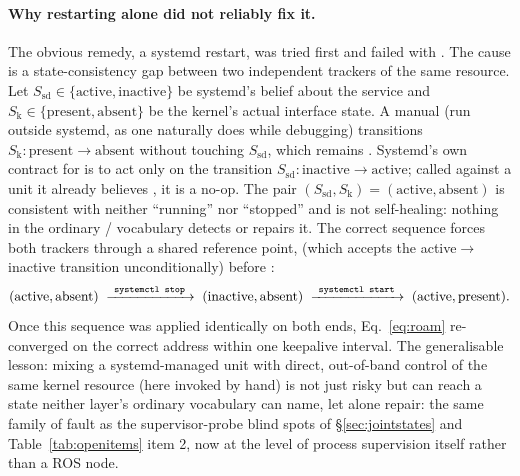 \paragraph{Why restarting alone did not reliably fix it.} The obvious remedy,
a systemd restart, was tried first and failed with
. The cause is a state-consistency gap
between two independent trackers of the same resource. Let
$S_{\mathrm{sd}}\in\{\text{active},\text{inactive}\}$ be systemd's belief
about the service and $S_{\mathrm{k}}\in\{\text{present},\text{absent}\}$ be
the kernel's actual interface state. A manual  (run
outside systemd, as one naturally does while debugging) transitions
$S_{\mathrm{k}}\!:\text{present}\!\to\!\text{absent}$ without touching
$S_{\mathrm{sd}}$, which remains . Systemd's own contract for
 is to act only on the transition
$S_{\mathrm{sd}}\!:\text{inactive}\!\to\!\text{active}$; called against a
unit it already believes , it is a no-op. The pair
$(S_{\mathrm{sd}},S_{\mathrm{k}}) = (\text{active},\text{absent})$ is
consistent with neither ``running'' nor ``stopped'' and is not self-healing:
nothing in the ordinary / vocabulary detects or
repairs it. The correct sequence forces both trackers through a shared
reference point,  (which accepts the active$\to$inactive
transition unconditionally) before :
\begin{equation}
(\text{active}, \text{absent})
\;\xrightarrow{\ \code{systemctl stop}\ }\;
(\text{inactive}, \text{absent})
\;\xrightarrow{\ \code{systemctl start}\ }\;
(\text{active}, \text{present}).
\end{equation}
Once this sequence was applied identically on both ends, Eq.~\eqref{eq:roam}
re-converged on the correct address within one keepalive interval. The
generalisable lesson: mixing a systemd-managed unit with direct,
out-of-band control of the same kernel resource (here 
invoked by hand) is not just risky but can reach a state neither layer's
ordinary vocabulary can name, let alone repair: the same family of fault
as the supervisor-probe blind spots of \S\ref{sec:jointstates} and
Table~\ref{tab:openitems} item 2, now at the level of process supervision
itself rather than a ROS node.

